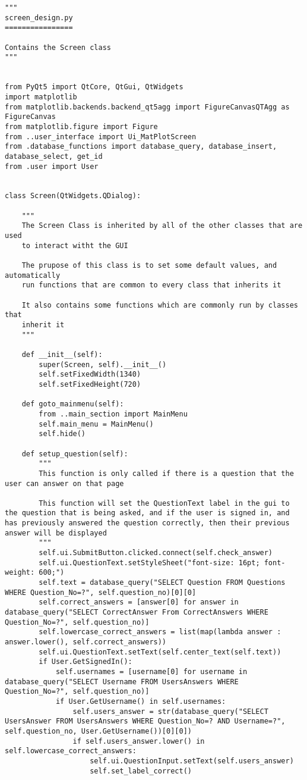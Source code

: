 \documentclass{article}
\begin{document}
\begin{lstlisting}
"""
screen_design.py
================

Contains the Screen class
"""


from PyQt5 import QtCore, QtGui, QtWidgets
import matplotlib
from matplotlib.backends.backend_qt5agg import FigureCanvasQTAgg as FigureCanvas
from matplotlib.figure import Figure
from ..user_interface import Ui_MatPlotScreen
from .database_functions import database_query, database_insert, database_select, get_id
from .user import User


class Screen(QtWidgets.QDialog):

    """
    The Screen Class is inherited by all of the other classes that are used
    to interact witht the GUI

    The prupose of this class is to set some default values, and automatically
    run functions that are common to every class that inherits it

    It also contains some functions which are commonly run by classes that
    inherit it
    """

    def __init__(self):
        super(Screen, self).__init__()
        self.setFixedWidth(1340)
        self.setFixedHeight(720)

    def goto_mainmenu(self):
        from ..main_section import MainMenu
        self.main_menu = MainMenu()
        self.hide()

    def setup_question(self):
        """
        This function is only called if there is a question that the user can answer on that page

        This function will set the QuestionText label in the gui to the question that is being asked, and if the user is signed in, and has previously answered the question correctly, then their previous answer will be displayed
        """
        self.ui.SubmitButton.clicked.connect(self.check_answer)
        self.ui.QuestionText.setStyleSheet("font-size: 16pt; font-weight: 600;")
        self.text = database_query("SELECT Question FROM Questions WHERE Question_No=?", self.question_no)[0][0]
        self.correct_answers = [answer[0] for answer in database_query("SELECT CorrectAnswer From CorrectAnswers WHERE Question_No=?", self.question_no)]
        self.lowercase_correct_answers = list(map(lambda answer : answer.lower(), self.correct_answers))
        self.ui.QuestionText.setText(self.center_text(self.text))
        if User.GetSignedIn():
            self.usernames = [username[0] for username in database_query("SELECT Username FROM UsersAnswers WHERE Question_No=?", self.question_no)]
            if User.GetUsername() in self.usernames:
                self.users_answer = str(database_query("SELECT UsersAnswer FROM UsersAnswers WHERE Question_No=? AND Username=?", self.question_no, User.GetUsername())[0][0])
                if self.users_answer.lower() in self.lowercase_correct_answers:
                    self.ui.QuestionInput.setText(self.users_answer)
                    self.set_label_correct()


\end{lstlisting}
\end{document}
